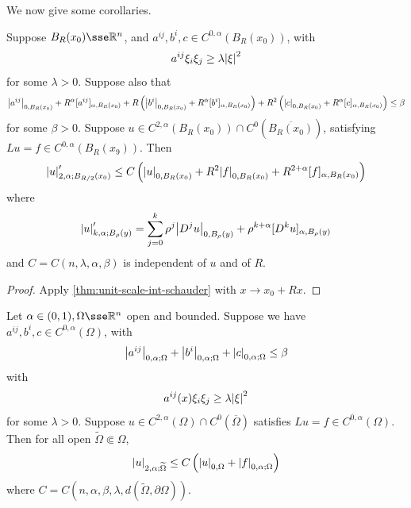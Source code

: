 \documentclass{article}
\begin{document}
\lec

We now give some corollaries.

\begin{corollary}
    \label{cor:scale-invariant-schauder-estimate}
    Suppose \(B_R(x_0) \sse \R^n\), and \(a^{ij}, b^i, c \in C^{0, \alpha}(B_R(x_0))\), with
    \[a^{ij}\xi_i\xi_j \ge \lambda\abs{\xi}^2\]
    for some \(\lambda > 0\). Suppose also that
    \[\abs{a^{ij}}_{0, B_R(x_0)} + R^\alpha[a^{ij}]_{\alpha, B_R(x_0)} + R\left(\abs{b^i}_{0, B_R(x_0)} + R^\alpha[b^i]_{\alpha, B_R(x_0)}\right) + R^2\left(\abs{c}_{0, B_R(x_0)} + R^\alpha[c]_{\alpha, B_R(x_0)}\right) \le \beta\]
    for some \(\beta > 0\). Suppose \(u \in C^{2, \alpha}(B_R(x_0)) \cap C^0(\overline{B_R(x_0)})\), satisfying \(Lu = f \in C^{0, \alpha}(B_R(x_9))\). Then
    \[\abs{u}'_{2, \alpha; B_{R/2}(x_0)} \le C\left(\abs{u}_{0, B_R(x_0)} + R^2\abs{f}_{0, B_R(x_0)} + R^{2 + \alpha}[f]_{\alpha, B_R(x_0)}\right)\]
    where
    \[\abs{u}'_{k, \alpha; B_\rho(y)} = \sum_{j=0}^k \rho^j\abs{D^ju}_{0, B_\rho(y)} + \rho^{k + \alpha}[D^ku]_{\alpha, B_\rho(y)}\]
    and \(C = C(n, \lambda, \alpha, \beta)\) is independent of \(u\) and of \(R\).
\end{corollary}

\begin{proof}
    Apply \cref{thm:unit-scale-int-schauder} with \(x \to x_0 + R x\).
\end{proof}

\begin{corollary}
    Let \(\alpha \in (0, 1), \Omega \sse \R^n\) open and bounded. Suppose we have \(a^{ij}, b^i, c \in C^{0, \alpha}(\Omega)\), with
    \[\abs{a^{ij}}_{0, \alpha; \Omega} + \abs{b^i}_{0, \alpha; \Omega} + \abs{c}_{0, \alpha; \Omega} \le \beta\]
    with
    \[a^{ij}(x)\xi_i\xi_j \ge \lambda \abs{\xi}^2\]
    for some \(\lambda > 0\). Suppose \(u \in C^{2, \alpha}(\Omega) \cap C^0(\overline\Omega)\) satisfies \(Lu = f \in C^{0, \alpha}(\Omega)\). Then for all open \(\widetilde \Omega \Subset \Omega\),
    \[\abs{u}_{2, \alpha; \widetilde \Omega} \le C\left(\abs{u}_{0, \Omega} + \abs{f}_{0, \alpha; \Omega}\right)\]
    where \(C = C(n, \alpha, \beta, \lambda, d(\widetilde\Omega, \partial\Omega))\).
\end{corollary}
\end{document}
